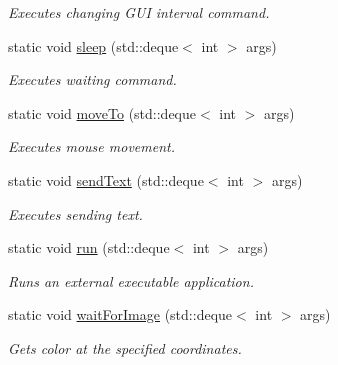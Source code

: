 \begin{DoxyCompactItemize}
\begin{DoxyCompactList}\small\item\em Executes changing G\-U\-I interval command. \end{DoxyCompactList}\item 
static void \hyperlink{class_lua_api_engine_a6910c482ffa6327999b49504522991b7}{sleep} (std\-::deque$<$ int $>$ args)
\begin{DoxyCompactList}\small\item\em Executes waiting command. \end{DoxyCompactList}\item 
static void \hyperlink{class_lua_api_engine_a8512ba309e37218b1586f8a41cae4451}{move\-To} (std\-::deque$<$ int $>$ args)
\begin{DoxyCompactList}\small\item\em Executes mouse movement. \end{DoxyCompactList}\item 
static void \hyperlink{class_lua_api_engine_a396ae61c3f7c771f5fe06584cef15169}{send\-Text} (std\-::deque$<$ int $>$ args)
\begin{DoxyCompactList}\small\item\em Executes sending text. \end{DoxyCompactList}\item 
static void \hyperlink{class_lua_api_engine_ab5acad2a0387e17c58ba85c885d8bc55}{run} (std\-::deque$<$ int $>$ args)
\begin{DoxyCompactList}\small\item\em Runs an external executable application. \end{DoxyCompactList}\item 
static void \hyperlink{class_lua_api_engine_a865f4456b04ea93d96ba3f380297bf61}{wait\-For\-Image} (std\-::deque$<$ int $>$ args)
\begin{DoxyCompactList}\small\item\em Gets color at the specified coordinates. \end{DoxyCompactList}\end{DoxyCompactItemize}
